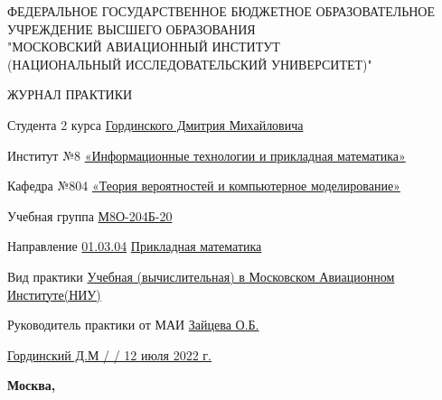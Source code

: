 \begin{titlepage}
\begin{center}
\bfseries

{\Large ФЕДЕРАЛЬНОЕ ГОСУДАРСТВЕННОЕ БЮДЖЕТНОЕ ОБРАЗОВАТЕЛЬНОЕ\\ УЧРЕЖДЕНИЕ ВЫСШЕГО ОБРАЗОВАНИЯ\\ "МОСКОВСКИЙ АВИАЦИОННЫЙ ИНСТИТУТ\\ (НАЦИОНАЛЬНЫЙ ИССЛЕДОВАТЕЛЬСКИЙ УНИВЕРСИТЕТ)"

}

\vspace{56pt}

{\large ЖУРНАЛ ПРАКТИКИ 

}

\end{center}

\vspace{36pt}

Студента 2 курса \hspace{3cm}        \underline{Гординского Дмитрия Михайловича}

\vspace{26pt}

Институт №8 \underline{«Информационные технологии и прикладная математика»}

\vspace{26pt}

Кафедра №804 \underline{«Теория вероятностей и компьютерное моделирование»}

\vspace{26pt}

Учебная группа \underline{М8О-204Б-20}

\vspace{26pt}

Направление \underline{01.03.04} \hspace{3cm} \underline{Прикладная математика}

\vspace{26pt}

Вид практики \underline{Учебная (вычислительная) в Московском Авиационном Институте(НИУ)}

\vspace{26pt}

Руководитель практики от МАИ \underline{Зайцева О.Б.} \hspace{3cm} \underline{ \hspace{3cm}}

\vspace{46pt}

\underline{Гординский Д.М / \hspace{3cm} / 12 июля 2022 г.}

\vfill

\begin{center}
\bfseries
Москва, \the\year
\end{center}
\end{titlepage}

\pagebreak
